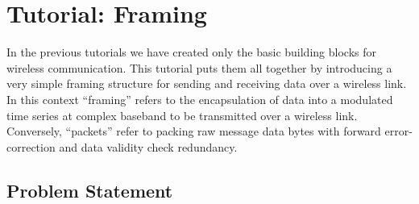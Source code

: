 % 
%

\newpage
\section{Tutorial: Framing}
\label{tutorial:framing}

In the previous tutorials we have created only the basic building blocks
for wireless communication.
This tutorial puts them all together by introducing a very simple
framing structure for sending and receiving data over a wireless link.
In this context ``framing'' refers to the encapsulation of data into a
modulated time series at complex baseband to be transmitted over a
wireless link.
Conversely, ``packets'' refer to packing raw message data bytes with
forward error-correction and data validity check redundancy.


%
%
\subsection{Problem Statement}
\label{tutorial:framing:problem}

